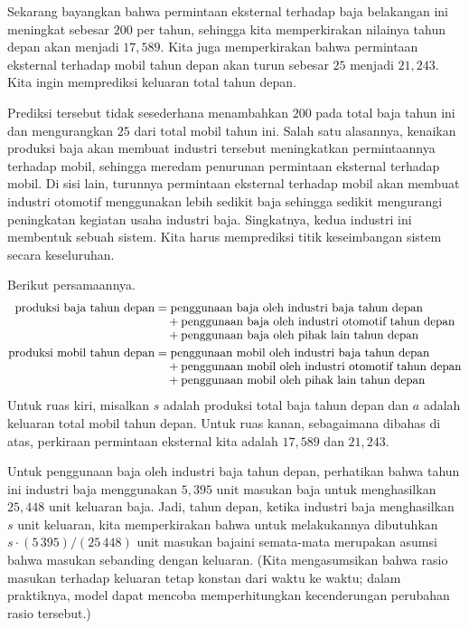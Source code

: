 Sekarang bayangkan bahwa permintaan eksternal terhadap baja belakangan ini
meningkat sebesar $200$ per tahun, sehingga kita memperkirakan nilainya tahun
depan akan menjadi $17,589$.
Kita juga memperkirakan bahwa permintaan eksternal terhadap mobil tahun depan
akan turun sebesar $25$ menjadi $21,243$.
Kita ingin memprediksi keluaran total tahun depan.

Prediksi tersebut tidak sesederhana menambahkan $200$ pada total baja tahun ini
dan mengurangkan $25$ dari total mobil tahun ini.
Salah satu alasannya, kenaikan produksi baja akan membuat
industri tersebut meningkatkan permintaannya terhadap mobil, sehingga
meredam penurunan permintaan eksternal terhadap mobil.
Di sisi lain, turunnya permintaan eksternal terhadap mobil akan membuat
industri otomotif menggunakan lebih sedikit baja sehingga sedikit mengurangi
peningkatan kegiatan usaha industri baja.
Singkatnya, kedua industri ini membentuk sebuah sistem.
Kita harus memprediksi titik keseimbangan sistem secara keseluruhan.

Berikut persamaannya.
\begin{align*}
  \text{produksi baja tahun depan}
     &=\text{penggunaan baja oleh industri baja tahun depan}   \\[-.8ex]
     &\quad\hbox{}+\text{penggunaan baja oleh industri otomotif tahun depan}  \\[-.8ex]
     &\quad\hbox{}+\text{penggunaan baja oleh pihak lain tahun depan} \\
  \text{produksi mobil tahun depan}
     &=\text{penggunaan mobil oleh industri baja tahun depan}   \\[-.8ex]
     &\quad\hbox{}+\text{penggunaan mobil oleh industri otomotif tahun depan}  \\[-.8ex]
     &\quad\hbox{}+\text{penggunaan mobil oleh pihak lain tahun depan}
\end{align*}
Untuk ruas kiri, misalkan
$s$ adalah produksi total baja tahun depan dan
$a$ adalah keluaran total mobil tahun depan.
Untuk ruas kanan, sebagaimana dibahas di atas,
perkiraan permintaan eksternal kita adalah $17,589$ dan $21,243$.

Untuk penggunaan baja oleh industri baja tahun depan, perhatikan bahwa tahun ini
industri baja menggunakan $5,395$ unit masukan baja untuk menghasilkan $25,448$
unit keluaran baja.
Jadi, tahun depan, ketika industri baja menghasilkan $s$ unit keluaran,
kita memperkirakan bahwa untuk melakukannya dibutuhkan
$s\cdot (5\,395)/(25\,448)$
unit masukan baja\Dash ini semata-mata merupakan asumsi bahwa masukan
sebanding dengan keluaran.
(Kita mengasumsikan bahwa rasio masukan terhadap keluaran tetap konstan dari waktu
ke waktu; dalam praktiknya, model dapat mencoba memperhitungkan kecenderungan
perubahan rasio tersebut.)

